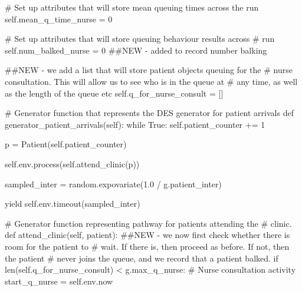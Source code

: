 \documentclass[
  letterpaper,
  DIV=11,
  numbers=noendperiod]{scrreprt}
\newenvironment{Shaded}{}{}
\newcommand{\BuiltInTok}[1]{\textcolor[rgb]{0.84,0.23,0.29}{#1}}
\newcommand{\CommentTok}[1]{\textcolor[rgb]{0.42,0.45,0.49}{#1}}
\newcommand{\ControlFlowTok}[1]{\textcolor[rgb]{0.84,0.23,0.29}{#1}}
\newcommand{\DecValTok}[1]{\textcolor[rgb]{0.00,0.36,0.77}{#1}}
\newcommand{\FloatTok}[1]{\textcolor[rgb]{0.00,0.36,0.77}{#1}}
\newcommand{\KeywordTok}[1]{\textcolor[rgb]{0.84,0.23,0.29}{#1}}
\newcommand{\NormalTok}[1]{\textcolor[rgb]{0.14,0.16,0.18}{#1}}
\newcommand{\OperatorTok}[1]{\textcolor[rgb]{0.14,0.16,0.18}{#1}}
\newcommand{\VariableTok}[1]{\textcolor[rgb]{0.89,0.38,0.04}{#1}}
\begin{document}
\begin{tcolorbox}
\begin{Shaded}
\begin{Highlighting}[]
        \CommentTok{\# Set up attributes that will store mean queuing times across the run}
        \VariableTok{self}\NormalTok{.mean\_q\_time\_nurse }\OperatorTok{=} \DecValTok{0}

        \CommentTok{\# Set up attributes that will store queuing behaviour results across}
        \CommentTok{\# run}
        \VariableTok{self}\NormalTok{.num\_balked\_nurse }\OperatorTok{=} \DecValTok{0} \CommentTok{\#\#NEW {-} added to record number balking}

        \CommentTok{\#\#NEW {-} we add a list that will store patient objects queuing for the}
        \CommentTok{\# nurse consultation.  This will allow us to see who is in the queue at}
        \CommentTok{\# any time, as well as the length of the queue etc}
        \VariableTok{self}\NormalTok{.q\_for\_nurse\_consult }\OperatorTok{=}\NormalTok{ []}

    \CommentTok{\# Generator function that represents the DES generator for patient arrivals}
    \KeywordTok{def}\NormalTok{ generator\_patient\_arrivals(}\VariableTok{self}\NormalTok{):}
        \ControlFlowTok{while} \VariableTok{True}\NormalTok{:}
            \VariableTok{self}\NormalTok{.patient\_counter }\OperatorTok{+=} \DecValTok{1}

\NormalTok{            p }\OperatorTok{=}\NormalTok{ Patient(}\VariableTok{self}\NormalTok{.patient\_counter)}

            \VariableTok{self}\NormalTok{.env.process(}\VariableTok{self}\NormalTok{.attend\_clinic(p))}

\NormalTok{            sampled\_inter }\OperatorTok{=}\NormalTok{ random.expovariate(}\FloatTok{1.0} \OperatorTok{/}\NormalTok{ g.patient\_inter)}

            \ControlFlowTok{yield} \VariableTok{self}\NormalTok{.env.timeout(sampled\_inter)}

    \CommentTok{\# Generator function representing pathway for patients attending the}
    \CommentTok{\# clinic.}
    \KeywordTok{def}\NormalTok{ attend\_clinic(}\VariableTok{self}\NormalTok{, patient):}
        \CommentTok{\#\#NEW {-} we now first check whether there is room for the patient to}
        \CommentTok{\# wait.  If there is, then proceed as before.  If not, then the patient}
        \CommentTok{\# never joins the queue, and we record that a patient balked.}
        \ControlFlowTok{if} \BuiltInTok{len}\NormalTok{(}\VariableTok{self}\NormalTok{.q\_for\_nurse\_consult) }\OperatorTok{\textless{}}\NormalTok{ g.max\_q\_nurse:}
            \CommentTok{\# Nurse consultation activity}
\NormalTok{            start\_q\_nurse }\OperatorTok{=} \VariableTok{self}\NormalTok{.env.now}


\end{Highlighting}
\end{Shaded}
\end{tcolorbox}
\end{document}
